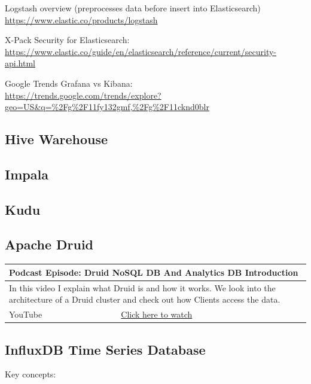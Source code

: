 \documentclass[12pt, numbers=noenddot]{scrreprt} %
\begin{document}
Logstash overview (preprocesses data before insert into Elasticsearch)
\url{https://www.elastic.co/products/logstash}

X-Pack Security for Elasticsearch: \\
\url{https://www.elastic.co/guide/en/elasticsearch/reference/current/security-api.html}

Google Trends Grafana vs Kibana: \\
\url{https://trends.google.com/trends/explore?geo=US&q=%2Fg%2F11fy132gmf,%2Fg%2F11cknd0blr}



\subsection{Hive Warehouse}
\subsection{Impala}
\subsection{Kudu}
\subsection{Apache Druid}

\begin{table}[h]
\begin{tabular}{ll}
\hline
\multicolumn{2}{l}{\textbf{Podcast Episode:} Druid NoSQL DB And Analytics DB Introduction} \\ \hline
\multicolumn{2}{p{15cm}}{In this video I explain what Druid is and how it works. 
We look into the architecture of a Druid cluster and check out how Clients access the data.}         \\ \hline
\multicolumn{1}{l|}{YouTube}   & \href{https://youtu.be/EiEIeBXSWjM}{Click here to watch}   \\  \hline
\end{tabular}
\end{table}




\subsection{InfluxDB Time Series Database}

Key concepts:
\end{document}
